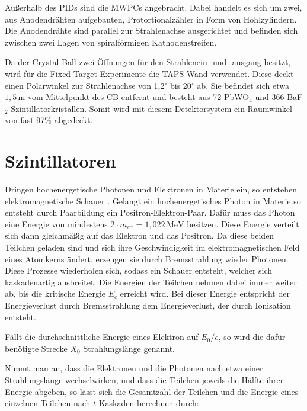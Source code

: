 \documentclass[a4paper,11pt,oneside,final,german,openbib,pdftex]{scrbook}
\begin{document}
{Au{\ss}erhalb des PIDs sind die MWPCs angebracht. Dabei handelt es sich um zwei, aus Anodendr\"ahten aufgebauten, Protortionalz\"ahler in Form von Hohlzylindern. Die Anodendr\"ahte sind parallel zur Strahlenachse ausgerichtet und befinden sich zwischen zwei Lagen von spiralf\"ormigen Kathodenstreifen. 

Da der Crystal-Ball zwei \"Offnungen f\"ur den Strahlenein- und -ausgang besitzt, wird f\"ur die Fixed-Target Experimente die TAPS-Wand verwendet.
Diese deckt einen Polarwinkel zur Strahlenachse von 1,2$^{\circ}$ bis 20$^{\circ}$ ab. Sie befindet sich etwa $1,5\,\text{m}$ vom Mittelpunkt des CB entfernt und besteht aus 72 PbWO$_4$ und 366 BaF$_2$ Szintillatorkristallen. 
 Somit wird mit diesem Detektorsystem ein Raumwinkel von fast 97\% abgedeckt.

\section{Szintillatoren}
\label{sec:Szintillatoren}
Dringen hochenergetische Photonen und Elektronen in Materie ein, so entstehen elektromagnetische Schauer
\cite{Leo87}.
Gelangt ein hochenergetisches Photon in Materie so entsteht durch Paarbildung ein Positron-Elektron-Paar. Dafür muss das Photon eine Energie von mindestens $2\cdot m_{e^-} = 1,022\,\text{MeV}$ besitzen. Diese Energie verteilt sich dann gleichmäßig auf das Elektron und das Positron. Da diese beiden Teilchen geladen sind und sich ihre Geschwindigkeit im elektromagnetischen Feld eines Atomkerns ändert, erzeugen sie durch Bremsstrahlung wieder Photonen. Diese Prozesse wiederholen sich, sodass ein Schauer entsteht, welcher sich kaskadenartig ausbreitet. Die Energien der Teilchen nehmen dabei immer weiter ab, bis die kritische Energie $E_c$ erreicht wird. Bei dieser Energie entspricht der Energieverlust durch Bremsstrahlung dem Energieverlust, der durch Ionisation entsteht.

Fällt die durchschnittliche Energie eines Elektron auf $E_0/e$, so wird die dafür benötigte Strecke $X_0$ Strahlungslänge genannt.
\newline

Nimmt man an, dass die Elektronen und die Photonen nach etwa einer Strahlungslänge wechselwirken, und dass die Teilchen jeweils die Hälfte ihrer Energie abgeben, so lässt sich die Gesamtzahl der Teilchen und die Energie eines einzelnen Teilchen nach $t$ Kaskaden berechnen durch\cite{Leo87}:

}
\end{document}
